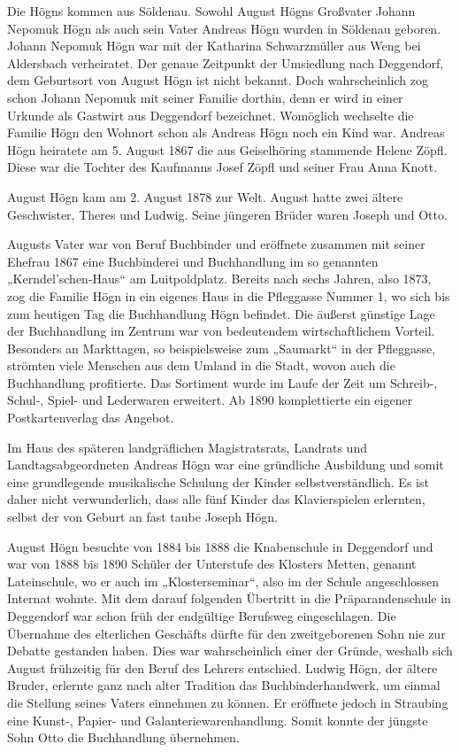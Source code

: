 \documentclass{book}
\begin{document}
Die Högns kommen aus Söldenau. Sowohl August Högns Großvater Johann
Nepomuk Högn als auch sein Vater Andreas Högn wurden in Söldenau
gebo\-ren. Johann Nepomuk Högn war mit der Katharina Schwarzmüller aus
Weng bei Aldersbach verheiratet. Der genaue Zeitpunkt der Umsiedlung
nach Deg\-gendorf, dem Geburtsort von August Högn ist nicht bekannt.
Doch wahr\-scheinlich zog schon Johann Nepomuk mit seiner Familie
dorthin, denn er wird in einer Urkunde als Gastwirt aus Deggendorf
bezeichnet. Womöglich wechselte die Familie Högn den Wohnort schon als
Andreas Högn noch ein Kind war. Andreas Högn heiratete am 5. August
1867 die aus Geiselhöring stammende Helene Zöpfl. Diese war die Tochter
des Kaufmanns Josef Zöpfl und seiner Frau Anna Knott.

August Högn kam am 2. August 1878 zur Welt. August hatte zwei ältere
Geschwister, Theres und Ludwig. Seine jüngeren Brüder waren Joseph und
Otto.

Augusts Vater war von Beruf Buchbinder und eröffnete zusammen mit seiner
Ehefrau 1867 eine Buchbinderei und Buchhandlung im so genannten
„Kerndel’schen-Haus“ am Luitpoldplatz. Bereits nach sechs Jahren, also
1873, zog die Familie Högn in ein eigenes Haus in die Pfleggasse Nummer
1, wo sich bis zum heutigen Tag die Buchhandlung Högn befindet. Die
äußerst gün\-stige Lage der Buchhandlung im Zentrum war von bedeutendem
wirtschaftlichem Vorteil. Besonders an Markttagen, so beispielsweise
zum „Saumarkt“ in der Pfleggasse, strömten viele Menschen aus dem
Umland in die Stadt, wovon auch die Buchhandlung profitierte. Das
Sortiment wurde im Laufe der Zeit um Schreib-, Schul-, Spiel- und
Lederwaren erweitert. Ab 1890 komplettierte ein eigener
Postkartenverlag das Angebot.

Im Haus des späteren landgräflichen Magistratsrats, Landrats und
Land\-tagsabgeordneten Andreas Högn war eine gründliche Ausbildung und
somit eine grundlegende musikalische Schulung der Kinder
selbstverständlich. Es ist daher nicht verwunderlich, dass alle fünf
Kinder das Klavierspielen erlernten, selbst der von Geburt an fast
taube Joseph Högn.

August Högn besuchte von 1884 bis 1888 die Knabenschule in Deggen\-dorf
und war von 1888 bis 1890 Schüler der Unterstufe des Klosters Metten,
genannt Lateinschule, wo er auch im „Klosterseminar“, also im der
Schule angeschlossen Internat wohnte. Mit dem darauf folgenden
Übertritt in die Präparandenschule in Deggendorf war schon früh der
endgültige Berufsweg eingeschlagen. Die Übernahme des elterlichen
Geschäfts dürfte für den zweitgeborenen Sohn nie zur Debatte gestanden
haben. Dies war wahrscheinlich einer der Gründe, weshalb sich August
frühzeitig für den Beruf des Lehrers entschied. Ludwig Högn, der ältere
Bruder, erlernte ganz nach alter Tradition das Buchbinderhandwerk, um
einmal die Stellung seines Vaters einnehmen zu können. Er eröffnete
jedoch in Straubing eine Kunst-, Papier- und Galanteriewarenhandlung.
Somit konnte der jüngste Sohn Otto die Buchhandlung übernehmen.
\end{document}
